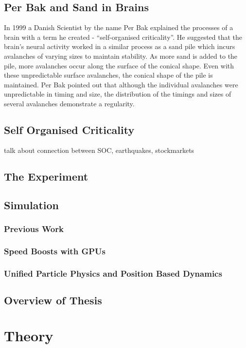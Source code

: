\documentclass{book}
\begin{document}
\section{Per Bak and Sand in Brains}
In 1999 a Danish Scientist by the name Per Bak explained the processes of a brain with a term he created - ``self-organised criticality''.  He suggested that the brain's neural activity worked in a similar process as a sand pile which incurs avalanches of varying sizes to maintain stability. As more sand is added to the pile, more avalanches occur along the surface of the conical shape. Even with these unpredictable surface avalanches, the conical shape of the pile is maintained. Per Bak pointed out that although the individual avalanches were unpredictable in timing and size, the distribution of the timings and sizes of several avalanches demonstrate a regularity.
\section{Self Organised Criticality}
talk about connection between SOC, earthquakes, stockmarkets

\section{The Experiment}

\section{Simulation}
\subsection{Previous Work}
\subsection{Speed Boosts with GPUs}
\subsection{Unified Particle Physics and Position Based Dynamics}


\section{Overview of Thesis}


\chapter{Theory}
\end{document}
